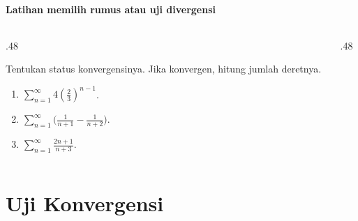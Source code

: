 \documentclass{../../kalkulus-ppt}
\begin{document}
\begin{frame}{\insertsection}
    \framesubtitle{Latihan memilih rumus atau uji divergensi}
    \begin{columns}[T,onlytextwidth]
        \begin{column}{.48\textwidth}
            \begin{latihan}
                Tentukan status konvergensinya. Jika konvergen,
                hitung jumlah deretnya.
                \begin{enumerate}
                    \item $\sum_{n=1}^\infty 4(\tfrac23)^{n-1}$.
                    \item $\sum_{n=1}^\infty
                        \bigl(\tfrac1{n+1}-\tfrac1{n+2}\bigr)$.
                    \item $\sum_{n=1}^\infty \tfrac{2n+1}{n+3}$.
                \end{enumerate}
            \end{latihan}
        \end{column}
        \begin{column}{.48\textwidth}
        \end{column}
    \end{columns}
\end{frame}

\section{Uji Konvergensi}
\end{document}
